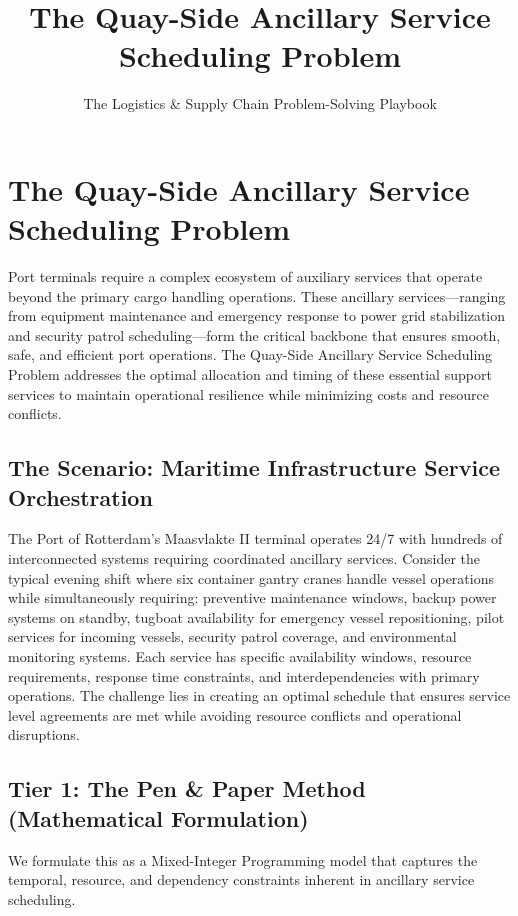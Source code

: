 \documentclass{article}
\title{The Quay-Side Ancillary Service Scheduling Problem}
\author{The Logistics \& Supply Chain Problem-Solving Playbook}
\date{}
\begin{document}
\maketitle

\section{The Quay-Side Ancillary Service Scheduling Problem}

Port terminals require a complex ecosystem of auxiliary services that operate beyond the primary cargo handling operations. These ancillary services---ranging from equipment maintenance and emergency response to power grid stabilization and security patrol scheduling---form the critical backbone that ensures smooth, safe, and efficient port operations. The Quay-Side Ancillary Service Scheduling Problem addresses the optimal allocation and timing of these essential support services to maintain operational resilience while minimizing costs and resource conflicts.

\subsection{The Scenario: Maritime Infrastructure Service Orchestration}

The Port of Rotterdam's Maasvlakte II terminal operates 24/7 with hundreds of interconnected systems requiring coordinated ancillary services. Consider the typical evening shift where six container gantry cranes handle vessel operations while simultaneously requiring: preventive maintenance windows, backup power systems on standby, tugboat availability for emergency vessel repositioning, pilot services for incoming vessels, security patrol coverage, and environmental monitoring systems. Each service has specific availability windows, resource requirements, response time constraints, and interdependencies with primary operations. The challenge lies in creating an optimal schedule that ensures service level agreements are met while avoiding resource conflicts and operational disruptions.

\subsection{Tier 1: The Pen \& Paper Method (Mathematical Formulation)}

We formulate this as a Mixed-Integer Programming model that captures the temporal, resource, and dependency constraints inherent in ancillary service scheduling.
\end{document}
